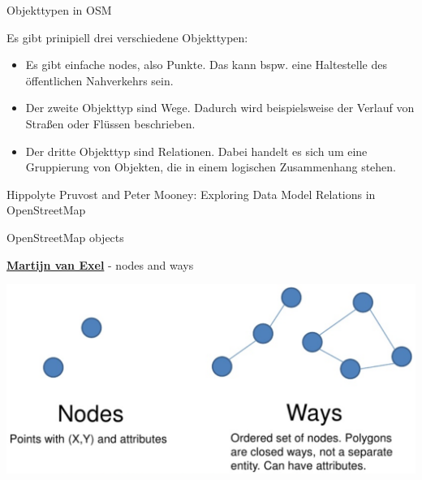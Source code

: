 \documentclass[ignorenonframetext,]{beamer}
\providecommand{\tightlist}{%
  \setlength{\itemsep}{0pt}\setlength{\parskip}{0pt}}
\begin{document}
\begin{frame}{Objekttypen in OSM}
\protect\hypertarget{objekttypen-in-osm}{}

\begin{block}{Es gibt prinipiell drei verschiedene Objekttypen:}

\begin{itemize}
\tightlist
\item
  Es gibt einfache nodes, also Punkte. Das kann bspw. eine Haltestelle
  des öffentlichen Nahverkehrs sein.
\item
  Der zweite Objekttyp sind Wege. Dadurch wird beispielsweise der
  Verlauf von Straßen oder Flüssen beschrieben.
\item
  Der dritte Objekttyp sind Relationen. Dabei handelt es sich um eine
  Gruppierung von Objekten, die in einem logischen Zusammenhang stehen.
\end{itemize}

Hippolyte Pruvost and Peter Mooney: Exploring Data Model Relations in
OpenStreetMap

\end{block}

\end{frame}

\begin{frame}{OpenStreetMap objects}
\protect\hypertarget{openstreetmap-objects}{}

\begin{block}{\href{https://www.slideshare.net/mvexel/openstreetmap-9819440}{\textbf{Martijn
van Exel}} - nodes and ways}

\includegraphics{figure/Nodes_ways.PNG}

\end{block}

\end{frame}
\end{document}
